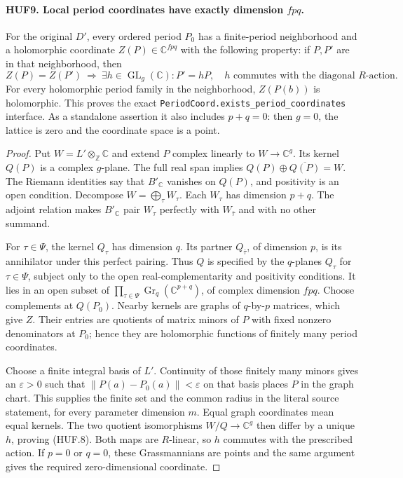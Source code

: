 \documentclass[11pt,a4paper]{article}
\numberwithin{equation}{section}
\theoremstyle{remark}\newtheorem{remark}[theorem]{Remark}
\begin{document}
\paragraph{HUF9. Local period coordinates have exactly dimension \(fpq\).}
\label{claim:HUF9}
For the original \(D'\), every ordered period \(P_0\)
has a finite-period neighborhood and a holomorphic
coordinate \(Z(P)\in\mathbb C^{fpq}\) with the following
property: if \(P,P'\) are in that neighborhood, then
\[
 Z(P)=Z(P')\ \Longrightarrow\
 \exists h\in\operatorname{GL}_g(\mathbb C):
          P'=hP,\quad h\text{ commutes with the diagonal }R\text{-action}.
 \tag{HUF.8}
\]
For every holomorphic period family in the neighborhood,
\(Z(P(b))\) is holomorphic.  This proves the exact
\texttt{Period\allowbreak Coord.\allowbreak exists\_\allowbreak period\_\allowbreak coordinates} interface.
As a standalone assertion it also includes \(p+q=0\):
then \(g=0\), the lattice is zero and the coordinate
space is a point.

\begin{proof}
Put \(W=L'\otimes_{\mathbb Z}\mathbb C\) and extend \(P\)
complex linearly to \(W\to\mathbb C^g\).
Its kernel \(Q(P)\) is a complex \(g\)-plane.
The full real span implies
\(Q(P)\oplus\overline{Q(P)}=W\).
The Riemann identities say that \(B'_\mathbb C\) vanishes
on \(Q(P)\), and positivity is an open condition.
Decompose \(W=\bigoplus_\tau W_\tau\).
Each \(W_\tau\) has dimension \(p+q\).
The adjoint relation makes \(B'_\mathbb C\) pair
\(W_\tau\) perfectly with \(W_{\bar\tau}\) and with
no other summand.

For \(\tau\in\Psi\), the kernel \(Q_\tau\) has dimension
\(q\).  Its partner \(Q_{\bar\tau}\), of dimension \(p\),
is its annihilator under this perfect pairing.
Thus \(Q\) is specified by the \(q\)-planes \(Q_\tau\)
for \(\tau\in\Psi\), subject only to the open
real-complementarity and positivity conditions.
It lies in an open subset of
\(\prod_{\tau\in\Psi}\operatorname{Gr}_q(\mathbb C^{p+q})\),
of complex dimension \(fpq\).
Choose complements at \(Q(P_0)\).  Nearby kernels are
graphs of \(q\)-by-\(p\) matrices, which give \(Z\).
Their entries are quotients of matrix minors of \(P\)
with fixed nonzero denominators at \(P_0\); hence they
are holomorphic functions of finitely many period
coordinates.

Choose a finite integral basis of \(L'\).
Continuity of those finitely many minors gives an
\(\varepsilon>0\) such that
\(\|P(a)-P_0(a)\|<\varepsilon\) on that basis places
\(P\) in the graph chart.  This supplies the finite
set and the common radius in the literal source
statement, for every parameter dimension \(m\).
Equal graph coordinates mean equal kernels.  The
two quotient isomorphisms \(W/Q\to\mathbb C^g\)
then differ by a unique \(h\), proving (HUF.8).
Both maps are \(R\)-linear, so \(h\) commutes with
the prescribed action.  If \(p=0\) or \(q=0\),
these Grassmannians are points and the same argument
gives the required zero-dimensional coordinate.
\end{proof}
\end{document}
